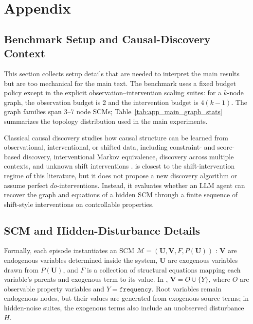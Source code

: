 \section{Appendix}
\label{app:appendix}

\subsection{Benchmark Setup and Causal-Discovery Context}
\label{app:setup_details}

This section collects setup details that are needed to interpret the main
results but are too mechanical for the main text. The benchmark uses a fixed
budget policy except in the explicit observation--intervention scaling suites:
for a \(k\)-node graph, the observation budget is 2 and the intervention budget
is \(4(k - 1)\). The graph families span 3--7 node SCMs; Table~\ref{tab:app_main_graph_stats}
summarizes the topology distribution used in the main experiments.

Classical causal discovery studies how causal structure can be learned from
observational, interventional, or shifted data, including constraint- and
score-based discovery, interventional Markov equivalence, discovery across
multiple contexts, and unknown shift interventions
\citep{Pearl_2009,andersson1997mec,JMLR:v13:hauser12a,JMLR:v21:17-123,backshift2015,zang2023discovering}.
\projectname{} is closest to the shift-intervention regime of this literature,
but it does not propose a new discovery algorithm or assume perfect
\(do\)-interventions. Instead, it evaluates whether an LLM agent can recover
the graph and equations of a hidden SCM through a finite sequence of
shift-style interventions on controllable properties.

\subsection{SCM and Hidden-Disturbance Details}
\label{app:scm_details}

Formally, each episode instantiates an SCM
\(\mathcal{M}=(\mathbf{U},\mathbf{V},F,P(\mathbf{U}))\)
\citep{Pearl_2009}: \(\mathbf{V}\) are endogenous variables determined inside
the system, \(\mathbf{U}\) are exogenous variables drawn from \(P(\mathbf{U})\),
and \(F\) is a collection of structural equations mapping each variable's
parents and exogenous term to its value. In \projectname{},
\(\mathbf{V}=O\cup\{Y\}\), where \(O\) are observable property variables and
\(Y=\texttt{frequency}\). Root variables remain endogenous nodes, but their
values are generated from exogenous source terms; in hidden-noise suites, the
exogenous terms also include an unobserved disturbance \(H\).

